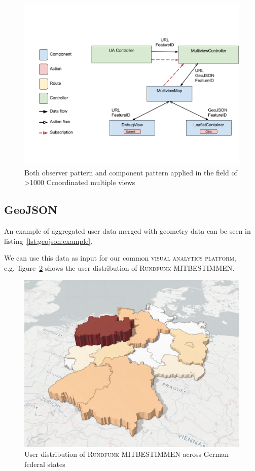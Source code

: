 \documentclass{article}
\newcommand{\rufu}{\textsc{Rundfunk MITBESTIMMEN}}
\newcommand{\visan}{\textsc{visual analytics platform}}
\newcommand\hmm[1]{\ifnum\ifhmode\spacefactor\else2000\fi>1000 \uppercase{#1}\else#1\fi}
\newcommand{\cmvs}{\hmm{c}oordinated multiple views}
\begin{document}
\begin{figure}[h!]
  \centering
  \includegraphics[width=\textwidth]{images/both-patterns-implemented.png}
  \caption{%
    Both observer pattern and component pattern applied in the field of \cmvs{}
  }\label{fig:implementation:both-patterns}
\end{figure}


\subsection{GeoJSON}

An example of aggregated user data merged with geometry data can be seen in listing~\ref{lst:geojson:example}.


We can use this data as input for our common \visan{}, e.g.\ figure~\ref{fig:implementation:user_distribution} shows the user distribution of \rufu{}.

\begin{figure}[h!]
  \centering
  \includegraphics[width=\textwidth]{images/ua_example.png}
  \caption{%
    User distribution of \rufu{} across German federal states
  }\label{fig:implementation:user_distribution}
\end{figure}
\end{document}
